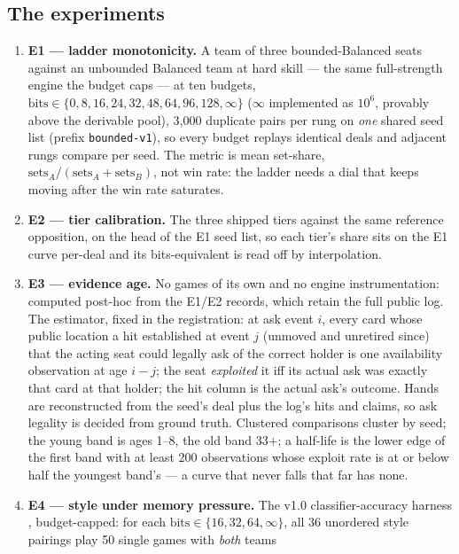 \documentclass[11pt]{article}
\newcommand{\code}[1]{\texttt{#1}}
\begin{document}
\subsection{The experiments}
\label{sec:experiments}

\begin{enumerate}
\item \textbf{E1 --- ladder monotonicity.} A team of three bounded-Balanced seats
  against an unbounded Balanced team at hard skill --- the same full-strength engine the
  budget caps --- at ten budgets, $\text{bits} \in \{0, 8, 16, 24, 32, 48, 64, 96, 128,
  \infty\}$ ($\infty$ implemented as $10^6$, provably above the derivable pool), 3{,}000
  duplicate pairs per rung on \emph{one} shared seed list (prefix \code{bounded-v1}), so
  every budget replays identical deals and adjacent rungs compare per seed. The metric
  is mean set-share, $\text{sets}_A / (\text{sets}_A + \text{sets}_B)$, not win rate:
  the ladder needs a dial that keeps moving after the win rate saturates.
\item \textbf{E2 --- tier calibration.} The three shipped tiers against the same
  reference opposition, on the head of the E1 seed list, so each tier's share sits on
  the E1 curve per-deal and its bits-equivalent is read off by interpolation.
\item \textbf{E3 --- evidence age.} No games of its own and no engine instrumentation:
  computed post-hoc from the E1/E2 records, which retain the full public log. The
  estimator, fixed in the registration: at ask event $i$, every card whose public
  location a hit established at event $j$ (unmoved and unretired since) that the acting
  seat could legally ask of the correct holder is one availability observation at age
  $i - j$; the seat \emph{exploited} it iff its actual ask was exactly that card at that
  holder; the hit column is the actual ask's outcome. Hands are reconstructed from the
  seed's deal plus the log's hits and claims, so ask legality is decided from ground
  truth. Clustered comparisons cluster by seed; the young band is ages 1--8, the old
  band 33$+$; a half-life is the lower edge of the first band with at least 200
  observations whose exploit rate is at or below half the youngest band's --- a curve
  that never falls that far has none.
\item \textbf{E4 --- style under memory pressure.} The v1.0 classifier-accuracy harness
  \cite{v10paper,obspaper}, budget-capped: for each $\text{bits} \in \{16, 32, 64,
  \infty\}$, all 36 unordered style pairings play 50 single games with \emph{both} teams

\end{enumerate}
\end{document}
